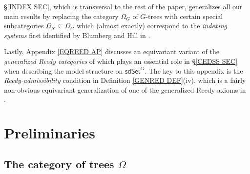 \documentclass[a4paper,10pt
]{article}%
\begin{document}
\S \ref{INDEX SEC}, which is transversal to the rest of the paper, generalizes all our main results by replacing the category $\Omega_G$ of $G$-trees
with certain special subcategories
$\Omega_{\mathcal{F}} \subseteq \Omega_G$
which (almost exactly) correspond to the 
\textit{indexing systems} first identified
by Blumberg and Hill in \cite{BH15}.

Lastly, Appendix \ref{EQREED AP} discusses an equivariant variant of the \textit{generalized Reedy categories}
of \cite{BM11} which plays an essential role in \S \ref{CEDSS SEC}
when describing the model structure on $\mathsf{sdSet}^G$.
The key to this appendix is the \textit{Reedy-admissibility} condition in 
Definition \ref{GENRED DEF}(iv),
which is a fairly non-obvious equivariant generalization of one of the generalized Reedy axioms in \cite{BM11}.



\section{Preliminaries}\label{PREL SEC}

\subsection{The category of trees $\Omega$}
\end{document}
